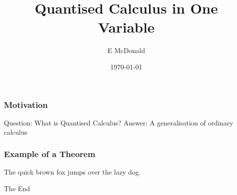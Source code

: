\documentclass{beamer}
\title[Quantised Calculus]{Quantised Calculus in One Variable}
\author{E McDonald}
\institute[UNSW] { UNSW Australia }
\date{\today}
\begin{document}
 


\begin{frame} 
\titlepage 
\end{frame} %



\begin{frame} 

\frametitle{Motivation} 

\begin{block} 
{Question: What is Quantised Calculus?} 
Answer: A generalisation of ordinary calculus
\end{block}

\end{frame} %

\begin{frame} 
\frametitle{Example of a Theorem} 
\begin{theorem}
The quick brown fox jumps over the lazy dog. 
\end{theorem}
\end{frame} 

\begin{frame} 

\centerline{The End} 

\end{frame} %
\end{document}
